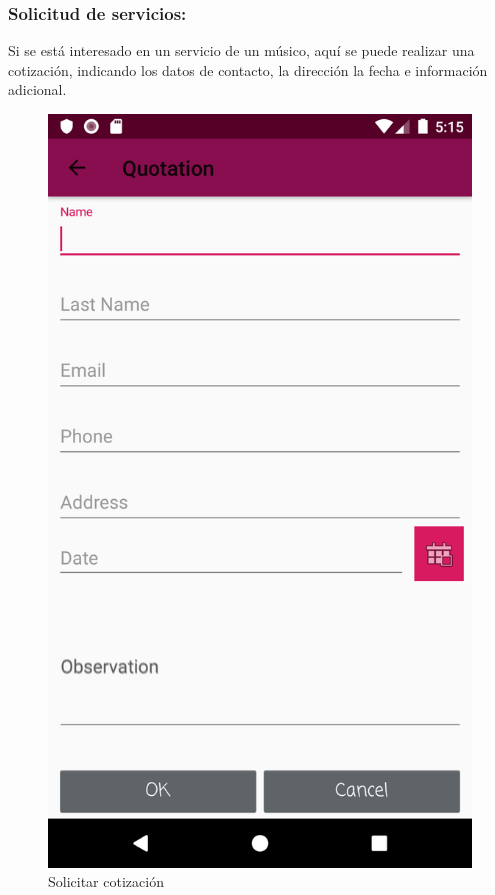 \subsubsection{Solicitud de servicios:}
Si se está interesado en un servicio de un músico, aquí se puede realizar una cotización, indicando los datos de contacto, la dirección la fecha e información adicional. 
\begin{figure}[hbt!]
 \centering
\includegraphics[width=0.6\linewidth]{Desarrollo/Interfaces/Interfaces/imgs/quotation.png}
\caption{Solicitar cotización}
\end{figure}

\newpage

